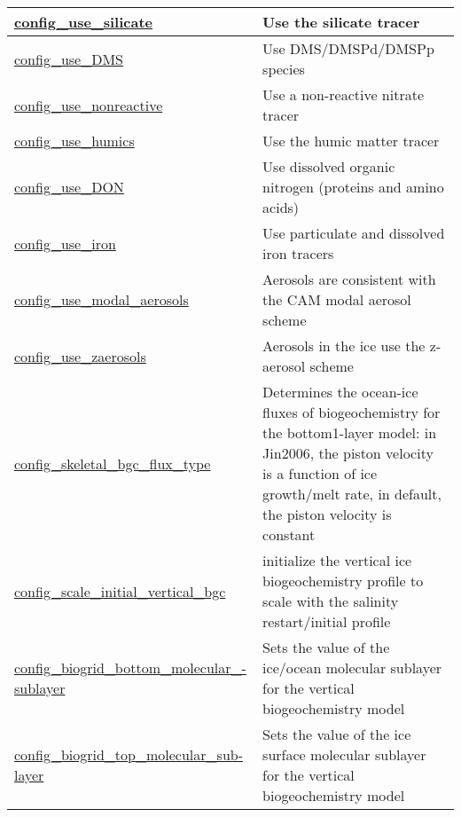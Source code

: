 {\begin{center}
\begin{longtable}{| p{2.0in} || p{4.0in} |}
    \hline
    \hyperref[subsec:nm_sec_config_use_silicate]{config\_use\_silicate} & Use the silicate tracer \\
    \hline
    \hyperref[subsec:nm_sec_config_use_DMS]{config\_use\_DMS} & Use DMS/DMSPd/DMSPp species \\
    \hline
    \hyperref[subsec:nm_sec_config_use_nonreactive]{config\_use\_nonreactive} & Use a non-reactive nitrate tracer \\
    \hline
    \hyperref[subsec:nm_sec_config_use_humics]{config\_use\_humics} & Use the humic matter tracer \\
    \hline
    \hyperref[subsec:nm_sec_config_use_DON]{config\_use\_DON} & Use dissolved organic nitrogen (proteins and amino acids) \\
    \hline
    \hyperref[subsec:nm_sec_config_use_iron]{config\_use\_iron} & Use particulate and dissolved iron tracers \\
    \hline
    \hyperref[subsec:nm_sec_config_use_modal_aerosols]{config\_use\_modal\_aerosols} & Aerosols are consistent with the CAM modal aerosol scheme \\
    \hline
    \hyperref[subsec:nm_sec_config_use_zaerosols]{config\_use\_zaerosols} & Aerosols in the ice use the z-aerosol scheme \\
    \hline
    \hyperref[subsec:nm_sec_config_skeletal_bgc_flux_type]{config\_skeletal\_bgc\_flux\_type} & Determines the ocean-ice fluxes of biogeochemistry for the bottom1-layer model: in Jin2006,    the piston velocity is a function of ice growth/melt rate, in default, the piston velocity    is constant \\
    \hline
    \hyperref[subsec:nm_sec_config_scale_initial_vertical_bgc]{config\_scale\_initial\_vertical\_bgc} & initialize the vertical ice biogeochemistry profile to scale with    the salinity restart/initial profile \\
    \hline
    \hyperref[subsec:nm_sec_config_biogrid_bottom_molecular_sublayer]{config\_biogrid\_bottom\_molecular\_-}\hyperref[subsec:nm_sec_config_biogrid_bottom_molecular_sublayer]{sublayer}& Sets the value of the ice/ocean molecular sublayer for the vertical biogeochemistry model \\
    \hline
    \hyperref[subsec:nm_sec_config_biogrid_top_molecular_sublayer]{config\_biogrid\_top\_molecular\_sub-}\hyperref[subsec:nm_sec_config_biogrid_top_molecular_sublayer]{layer}& Sets the value of the ice surface molecular sublayer for the vertical biogeochemistry model \\
    \hline

\end{longtable}
\end{center}}
